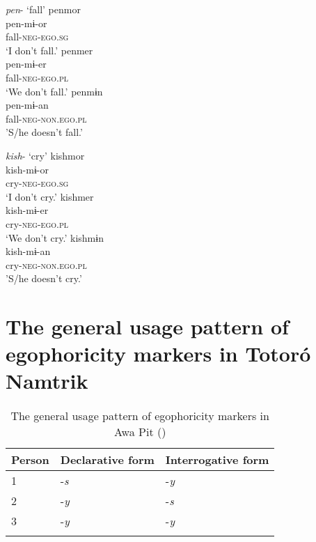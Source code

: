 \documentclass[output=paper]{langsci/langscibook}
\begin{document}
\ea \textit{pen}- `fall' 
	\ea \label{ex:gg17}
    \glll penmor\\ 
    pen-mɨ-or\\
         fall-\textsc{neg-ego.sg}\\
    \glt ‘I don't fall.’
  \ex \label{ex:gg18}
    \glll penmer\\
    pen-mɨ-er\\
    fall-\textsc{neg-ego.pl}\\
    \glt ‘We don't fall.’
   \ex \label{ex:gg19}
   \glll penmɨn\\
   pen-mɨ-an\\
   fall-\textsc{neg-non.ego.pl}\\
   \glt 'S/he doesn't fall.'
\z \z


\ea \textit{kish}- `cry' 
	\ea \label{ex:gg20}
    \glll kishmor\\
    kish-mɨ-or\\
         cry-\textsc{neg-ego.sg}\\
    \glt ‘I don't cry.’
  \ex \label{ex:gg21}
    \glll kishmer\\
    kish-mɨ-er\\
         cry-\textsc{neg-ego.pl}\\
    \glt ‘We don't cry.’
   \ex \label{ex:gg22}
   \glll kishmɨn\\
   kish-mɨ-an\\
   cry-\textsc{neg-non.ego.pl}\\
   \glt 'S/he doesn't cry.'
\z \z



\section{The general usage pattern of egophoricity markers in Totoró Namtrik}\label{s:gg3}
\begin{table}[b]
\begin{tabularx}{.8\textwidth}{XXl}
\lsptoprule
\textbf{Person} & \textbf{Declarative form} & \textbf{Interrogative form}\\
\midrule
1 & -\textit{s} & -\textit{y}\\
2 & -\textit{y} & -\textit{s}\\
3 & -\textit{y} & -\textit{y}\\
\lspbottomrule
\end{tabularx}
\caption{The general usage pattern of egophoricity markers in Awa Pit (\citealt{Curnow2002a})}
\label{tab:gg6}
\end{table}
\end{document}
